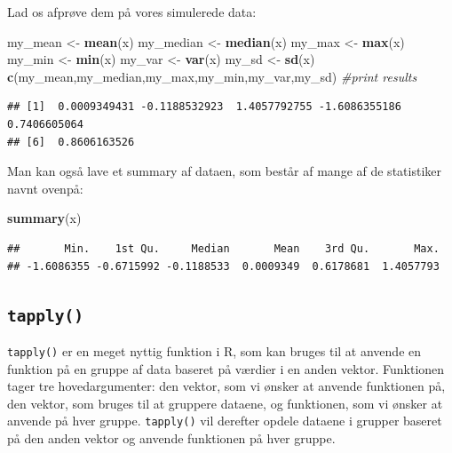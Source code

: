 \documentclass[
]{book}
\newenvironment{Shaded}{\begin{snugshade}}{\end{snugshade}}
\newcommand{\CommentTok}[1]{\textcolor[rgb]{0.56,0.35,0.01}{\textit{#1}}}
\newcommand{\FunctionTok}[1]{\textcolor[rgb]{0.13,0.29,0.53}{\textbf{#1}}}
\newcommand{\NormalTok}[1]{#1}
\newcommand{\OtherTok}[1]{\textcolor[rgb]{0.56,0.35,0.01}{#1}}
\begin{document}
Lad os afprøve dem på vores simulerede data:

\begin{Shaded}
\begin{Highlighting}[]
\NormalTok{my\_mean }\OtherTok{\textless{}{-}} \FunctionTok{mean}\NormalTok{(x)}
\NormalTok{my\_median }\OtherTok{\textless{}{-}} \FunctionTok{median}\NormalTok{(x)}
\NormalTok{my\_max }\OtherTok{\textless{}{-}} \FunctionTok{max}\NormalTok{(x)}
\NormalTok{my\_min }\OtherTok{\textless{}{-}} \FunctionTok{min}\NormalTok{(x)}
\NormalTok{my\_var }\OtherTok{\textless{}{-}} \FunctionTok{var}\NormalTok{(x)}
\NormalTok{my\_sd }\OtherTok{\textless{}{-}} \FunctionTok{sd}\NormalTok{(x)}
\FunctionTok{c}\NormalTok{(my\_mean,my\_median,my\_max,my\_min,my\_var,my\_sd) }\CommentTok{\#print results}
\end{Highlighting}
\end{Shaded}

\begin{verbatim}
## [1]  0.0009349431 -0.1188532923  1.4057792755 -1.6086355186  0.7406605064
## [6]  0.8606163526
\end{verbatim}

Man kan også lave et summary af dataen, som består af mange af de statistiker navnt ovenpå:

\begin{Shaded}
\begin{Highlighting}[]
\FunctionTok{summary}\NormalTok{(x)}
\end{Highlighting}
\end{Shaded}

\begin{verbatim}
##       Min.    1st Qu.     Median       Mean    3rd Qu.       Max. 
## -1.6086355 -0.6715992 -0.1188533  0.0009349  0.6178681  1.4057793
\end{verbatim}

\subsection{\texorpdfstring{\texttt{tapply()}}{tapply()}}\label{tapply}

\texttt{tapply()} er en meget nyttig funktion i R, som kan bruges til at anvende en funktion på en gruppe af data baseret på værdier i en anden vektor. Funktionen tager tre hovedargumenter: den vektor, som vi ønsker at anvende funktionen på, den vektor, som bruges til at gruppere dataene, og funktionen, som vi ønsker at anvende på hver gruppe. \texttt{tapply()} vil derefter opdele dataene i grupper baseret på den anden vektor og anvende funktionen på hver gruppe.
\end{document}
